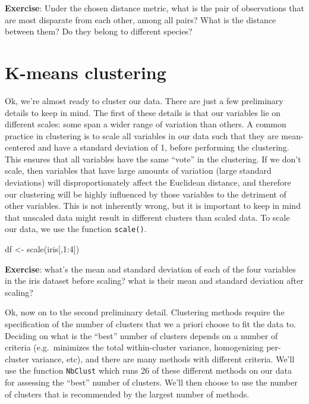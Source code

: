 \documentclass[
]{book}
\newenvironment{Shaded}{\begin{snugshade}}{\end{snugshade}}
\newcommand{\DecValTok}[1]{\textcolor[rgb]{0.00,0.00,0.81}{#1}}
\newcommand{\FunctionTok}[1]{\textcolor[rgb]{0.00,0.00,0.00}{#1}}
\newcommand{\NormalTok}[1]{#1}
\newcommand{\OtherTok}[1]{\textcolor[rgb]{0.56,0.35,0.01}{#1}}
\newcommand{\SpecialCharTok}[1]{\textcolor[rgb]{0.00,0.00,0.00}{#1}}
\begin{document}
\textbf{Exercise}: Under the chosen distance metric, what is the pair of observations that are most disparate from each other, among all pairs? What is the distance between them? Do they belong to different species?

\hypertarget{k-means-clustering}{%
\section{K-means clustering}\label{k-means-clustering}}

Ok, we're almost ready to cluster our data. There are just a few preliminary details to keep in mind.
The first of these details is that our variables lie on different scales: some span a wider range of variation than others. A common practice in clustering is to scale all variables in our data such that they are mean-centered and have a standard deviation of 1, before performing the clustering. This ensures that all variables have the same ``vote'' in the clustering. If we don't scale, then variables that have large amounts of variation (large standard deviations) will disproportionately affect the Euclidean distance, and therefore our clustering will be highly influenced by those variables to the detriment of other variables. This is not inherently wrong, but it is important to keep in mind that unscaled data might result in different clusters than scaled data. To scale our data, we use the function \texttt{scale()}.

\begin{Shaded}
\begin{Highlighting}[]
\NormalTok{df }\OtherTok{\textless{}{-}} \FunctionTok{scale}\NormalTok{(iris[,}\DecValTok{1}\SpecialCharTok{:}\DecValTok{4}\NormalTok{])}
\end{Highlighting}
\end{Shaded}

\textbf{Exercise}: what's the mean and standard deviation of each of the four variables in the iris dataset before scaling? what is their mean and standard deviation after scaling?

Ok, now on to the second preliminary detail. Clustering methods require the specification of the number of clusters that we a priori choose to fit the data to. Deciding on what is the ``best'' number of clusters depends on a number of criteria (e.g.~minimizes the total within-cluster variance, homogenizing per-cluster variance, etc), and there are many methods with different criteria. We'll use the function \texttt{NbClust} which runs 26 of these different methods on our data for assessing the ``best'' number of clusters. We'll then choose to use the number of clusters that is recommended by the largest number of methods.
\end{document}
